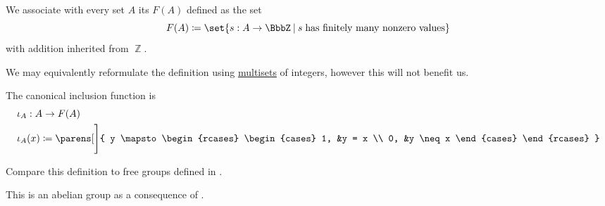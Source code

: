 \begin{definition}\label{def:free_abelian_group}\mimprovised
  We associate with every set \( A \) its  \( F(A) \) defined as the set
  \begin{equation*}
    F(A) \coloneqq \set{ s: A \to \BbbZ \given s \T{has finitely many nonzero values} }
  \end{equation*}
  with addition inherited from \( \BbbZ \).

  We may equivalently reformulate the definition using \hyperref[def:weighted_set/multiset]{multisets} of integers, however this will not benefit us.

  The canonical inclusion function is
  \begin{equation*}
    \begin{aligned}
      &\iota_A: A \to F(A) \\
      &\iota_A(x) \coloneqq \parens[\Bigg]
        {
          y \mapsto \begin{rcases}
            \begin{cases}
              1, &y = x \\
              0, &y \neq x
            \end{cases}
          \end{rcases}
        }
    \end{aligned}
  \end{equation*}

  Compare this definition to free groups defined in .
\end{definition}
\begin{defproof}
  This is an abelian group as a consequence of .
\end{defproof}

